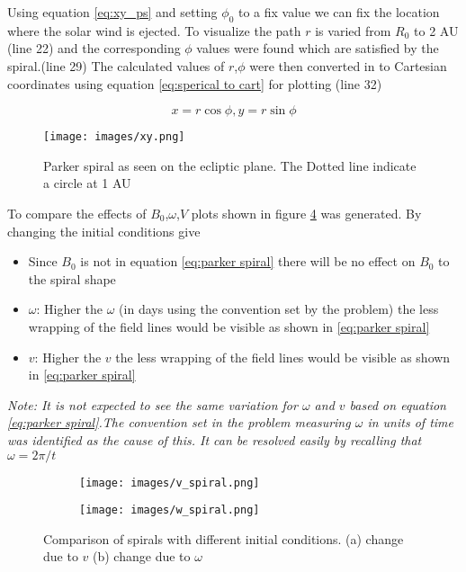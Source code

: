 \documentclass[letterpaper,skipsamekey,12pt,english]{article}
\begin{document}
Using equation \ref{eq:xy_ps} and setting $\phi_0$ to a fix value we can fix the location where the solar wind is ejected. To visualize the path $r$ is varied from $R_0$ to 2 AU (line 22) and the corresponding $\phi$ values were found which are satisfied by the spiral.(line 29) The calculated values of $r$,$\phi$ were then converted in to Cartesian coordinates using equation \ref{eq:sperical to cart} for plotting (line 32)

\begin{equation}
    \label{eq:sperical to cart}
    x= r \cos \phi , y = r \sin \phi
\end{equation}

\begin{figure}[h]
    \centering
    \texttt{[image: images/xy.png]}
    \caption{Parker spiral as seen on the ecliptic plane.  The Dotted line indicate a circle at 1 AU}
    \label{fig:Paker_sp}
    
\end{figure}

To compare the effects of $B_0$,$\omega$,$V$ plots shown in figure \ref{fig:wv_change} was generated. By changing the initial conditions give

\begin{itemize}[noitemsep]
    \item Since $B_0$ is not in equation \ref{eq:parker spiral} there will be no effect on $B_0$ to the spiral shape
    \item $\omega$: Higher the $\omega$ (in days using the convention set by the problem) the less wrapping of the field lines would be visible as shown in \ref{eq:parker spiral}
    \item $v$: Higher the $v$ the less wrapping of the field lines would be visible as shown in \ref{eq:parker spiral}
\end{itemize}
 
\textit{Note: It is not expected to see the same variation for $\omega$ and $v$ based on equation \ref{eq:parker spiral}.The convention set in the problem measuring $\omega$ in units of time was identified as the cause of this. It can be resolved easily by recalling that $\omega = 2\pi/t$}

\break



\begin{figure}[h]
\begin{subfigure}{0.5\textwidth}
\texttt{[image: images/v\_spiral.png]} 
\caption{}
\label{fig:subim1}
\end{subfigure}
\begin{subfigure}{0.5\textwidth}
\texttt{[image: images/w\_spiral.png]}
\caption{}
\label{fig:subim2}
\end{subfigure}

\caption{Comparison of spirals with different initial conditions. (a) change due to $v$ 
     (b) change due to $\omega$}
 \label{fig:wv_change}
\end{figure}
\end{document}
